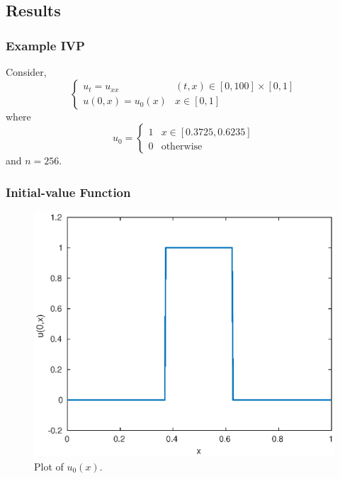 \documentclass{beamer}
\begin{document}
\subsection{Results}
\begin{frame}
	\frametitle{Example IVP}
	Consider,
			\[
			\begin{cases}
				u_t = u_{xx} & (t,x) \in [0,100] \times [0,1] \\
				u(0,x) = u_0(x) & x \in [0,1]
			\end{cases}
			\]
	where
	\begin{equation*}
		u_0 =
		\begin{cases}
			1 & x \in [0.3725,0.6235] \\
			0 & \text{otherwise}
		\end{cases}
	\end{equation*}
	and $n = 256$.
\end{frame}
\begin{frame}
	\frametitle{Initial-value Function}
	\begin{figure}[ht]
		\centering
		\includegraphics[scale=0.65]{../write-up/u0}
		\caption{Plot of $u_0(x)$.}
	\end{figure}
\end{frame}
\end{document}
